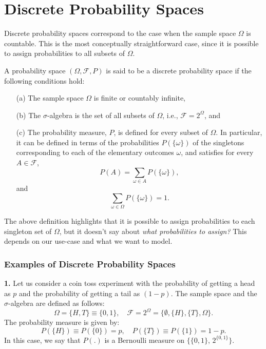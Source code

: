 \section{Discrete Probability Spaces}


Discrete probability spaces correspond to the case when the sample space $\Omega$ is countable. This is the most conceptually straightforward case, since it is possible to assign probabilities to all subsets of $\Omega$.

\begin{definition}
    A probability space $(\Omega, \mathcal{F}, P)$ is said to be a discrete probability space if the following conditions hold:
\begin{itemize}
    \item[(a)] The sample space $\Omega$ is finite or countably infinite,
    \item[(b)] The $\sigma$-algebra is the set of all subsets of $\Omega$, i.e., $\mathcal{F} = 2^\Omega$, and
    \item[(c)] The probability measure, $P$, is defined for every subset of $\Omega$. In particular, it can be defined in terms of the probabilities $P(\{\omega\})$ of the singletons corresponding to each of the elementary outcomes $\omega$, and satisfies for every $A \in \mathcal{F}$,
\[
P(A) = \sum_{\omega \in A} P(\{\omega\}),
\]
and
\[
\sum_{\omega \in \Omega} P(\{\omega\}) = 1.
\]
\end{itemize}
\end{definition}

The above definition highlights that it is possible to assign probabilities to each singleton set of $\Omega$, but it doesn't say about \textit{what probabilities to assign?} This depends on our use-case and what we want to model. 

\subsubsection{Examples of Discrete Probability Spaces}

\textbf{1.} Let us consider a coin toss experiment with the probability of getting a head as \( p \) and the probability of getting a tail as \( (1 - p) \). The sample space and the \(\sigma\)-algebra are defined as follows:
\[
\Omega = \{H, T\} \equiv \{0, 1\}, \quad \mathcal{F} = 2^{\Omega} = \{\emptyset, \{H\}, \{T\}, \Omega\}.
\]
The probability measure is given by:
\[
P(\{H\}) \equiv P(\{0\}) = p, \quad P(\{T\}) \equiv P(\{1\}) = 1 - p.
\]
In this case, we say that \( P(.) \) is a Bernoulli measure on \( \{\{0, 1\}, \, 2^{\{0, 1\}}\}\).\\

